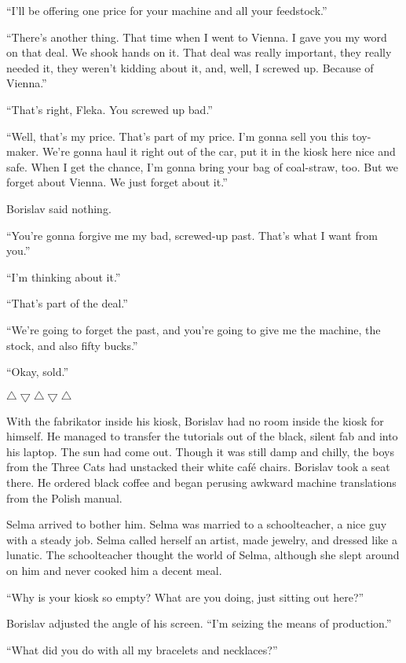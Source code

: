 \documentclass[20 pt,twoside,extrafontsizes,final]{memoir}
\begin{document}
``I'll be offering one price for your machine and all your feedstock.''

``There's another thing. That time when I went to Vienna. I gave you my word on that deal. We shook hands on it. That deal was really important, they really needed it, they weren't kidding about it, and, well, I screwed up. Because of Vienna.''

``That's right, Fleka. You screwed up bad.''

``Well, that's my price. That's part of my price. I'm gonna sell you this toy-maker. We're gonna haul it right out of the car, put it in the kiosk here nice and safe. When I get the chance, I'm gonna bring your bag  of coal-straw, too. But we forget about Vienna. We just forget about it.''

Borislav said nothing.

``You're gonna forgive me my bad, screwed-up past. That's what I want from you.''

``I'm thinking about it.''

``That's part of the deal.''

``We're going to forget the past, and you're going to give me the machine, the stock, and also fifty bucks.''

``Okay, sold.''

\bigskip\centerline{{$\bigtriangleup\bigtriangledown\bigtriangleup\bigtriangledown\bigtriangleup$}}\bigskip

With the fabrikator inside his kiosk, Borislav had no room inside the kiosk for himself. He managed to transfer the tutorials out of the black, silent fab and into his laptop. The sun had come out. Though it was still damp and chilly, the boys from the Three Cats had unstacked their white caf\'e chairs. Borislav took a seat there. He ordered black coffee and began perusing awkward machine translations from the Polish manual.

Selma arrived to bother him. Selma was married to a schoolteacher, a nice guy with a steady job.
Selma called herself an artist, made jewelry, and dressed like a lunatic. The schoolteacher thought the world of Selma, although she slept around on him and never cooked him a decent meal.

``Why is your kiosk so empty? What are you doing, just sitting out here?''

Borislav adjusted the angle of his screen. ``I'm seizing the means of production.''

``What did you do with all my bracelets and necklaces?''
\end{document}
